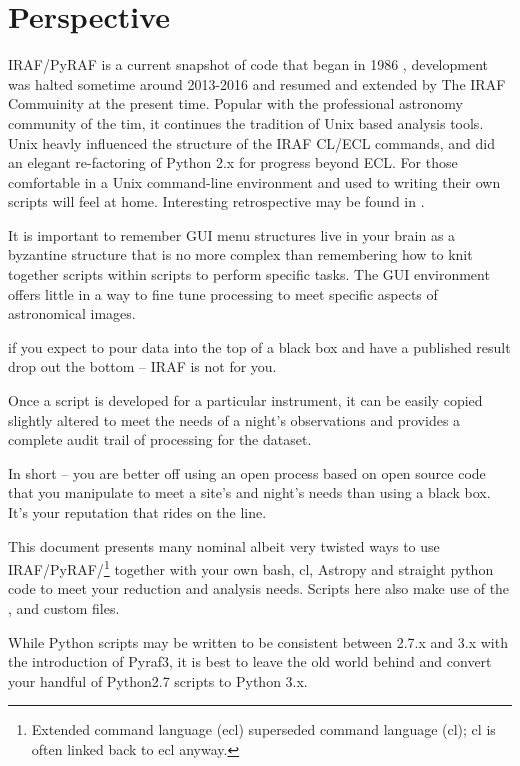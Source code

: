 \documentclass[letter,11pt,oneside]{article}
\newcommand{\dhl}[1]{{\color{verbcolor}{\texttt#1}}}
\begin{document}
\section{Perspective}

IRAF/PyRAF is a current snapshot of code that began in 1986
\cite{1986SPIE..627..733T}, development was halted sometime around
2013-2016 and resumed and extended by The IRAF Commuinity at the
present time. Popular with the professional astronomy community of the
tim, it continues the tradition of Unix based analysis tools. Unix
heavly influenced the structure of the IRAF CL/ECL commands, and did
an elegant re-factoring of Python 2.x for progress beyond ECL.  For
those comfortable in a Unix command-line environment and used to
writing their own scripts will feel at home. Interesting retrospective
may be found in \cite{FITSBirthday}.

It is important to remember GUI menu structures live in your
brain as a byzantine structure that is no more complex than
remembering how to knit together scripts within scripts to
perform specific tasks. The GUI environment offers little in
a way to fine tune processing to meet specific aspects of
astronomical images.

if you expect to pour data into the top of a black box and have
a published result drop out the bottom -- IRAF is not for you.

Once a script is developed for a particular instrument, it can be
easily copied slightly altered to meet the needs of a night's
observations and provides a complete audit trail of processing for the
dataset.

In short -- you are better off using an open process based on open
source code that you manipulate to meet a site's and night's needs
than using a black box.  It's your reputation that rides on the line.

This document presents many nominal albeit very twisted ways to use
IRAF/PyRAF/\dhl{.ecl}\footnote{Extended command language (ecl)
  superseded command language (cl); cl is often linked back to ecl
  anyway.} together with your own bash, cl, Astropy and
straight python code to meet your reduction and analysis needs.
Scripts here also make use of the \dhl{!bash excape},
and custom \dhl{.pyraf} files.

While Python scripts may be written to be consistent between 2.7.x and 3.x
with the introduction of Pyraf3, it is best to leave the old world
behind and convert your handful of Python2.7 scripts to Python 3.x.
\end{document}
